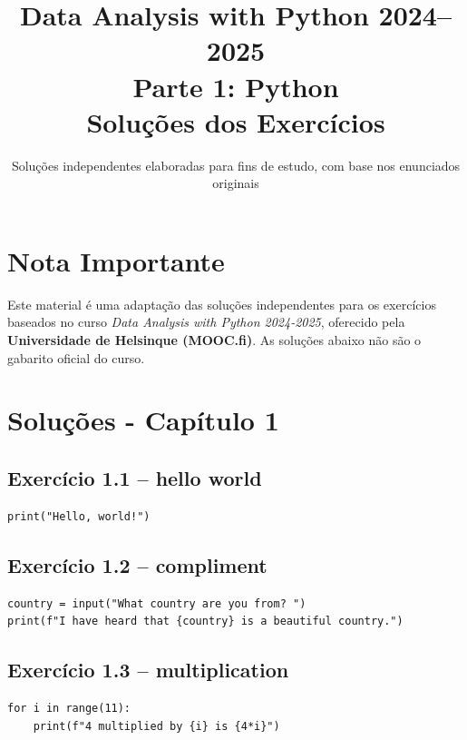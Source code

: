 \documentclass[11pt,a4paper]{article}
\title{\textbf{Data Analysis with Python 2024--2025}\\Parte 1: Python\\\large Soluções dos Exercícios}
\author{Soluções independentes elaboradas para fins de estudo, com base nos enunciados originais}
\date{}
\begin{document}
\maketitle

\section*{Nota Importante}
Este material é uma adaptação das soluções independentes para os exercícios baseados no curso \textit{Data Analysis with Python 2024-2025}, oferecido pela \textbf{Universidade de Helsinque (MOOC.fi)}. As soluções abaixo não são o gabarito oficial do curso.

\tableofcontents
\newpage

\section{Soluções - Capítulo 1}

\subsection*{Exercício 1.1 -- hello world}
\begin{solucao}
\begin{lstlisting}
print("Hello, world!")
\end{lstlisting}
\end{solucao}

\subsection*{Exercício 1.2 -- compliment}
\begin{solucao}
\begin{lstlisting}
country = input("What country are you from? ")
print(f"I have heard that {country} is a beautiful country.")
\end{lstlisting}
\end{solucao}

\subsection*{Exercício 1.3 -- multiplication}
\begin{solucao}
\begin{lstlisting}
for i in range(11):
    print(f"4 multiplied by {i} is {4*i}")
\end{lstlisting}
\end{solucao}
\end{document}
